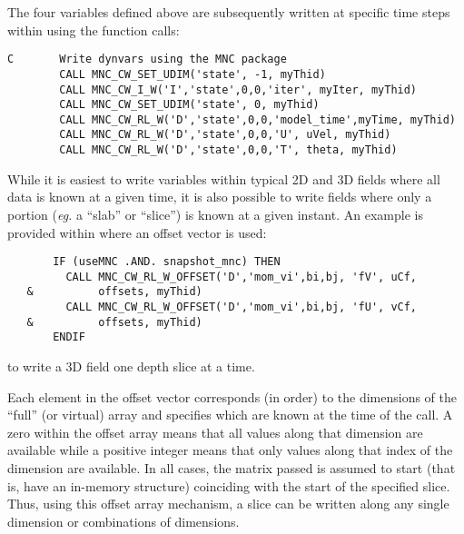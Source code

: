 The four variables defined above are subsequently written at specific
time steps within
using the function calls:
{\footnotesize
\begin{verbatim}
C       Write dynvars using the MNC package
        CALL MNC_CW_SET_UDIM('state', -1, myThid)
        CALL MNC_CW_I_W('I','state',0,0,'iter', myIter, myThid)
        CALL MNC_CW_SET_UDIM('state', 0, myThid)
        CALL MNC_CW_RL_W('D','state',0,0,'model_time',myTime, myThid)
        CALL MNC_CW_RL_W('D','state',0,0,'U', uVel, myThid)
        CALL MNC_CW_RL_W('D','state',0,0,'T', theta, myThid)
\end{verbatim}
}

While it is easiest to write variables within typical 2D and 3D fields
where all data is known at a given time, it is also possible to write
fields where only a portion (\textit{eg.} a ``slab'' or ``slice'') is
known at a given instant.  An example is provided within
where an offset vector is used: {\footnotesize
\begin{verbatim}
       IF (useMNC .AND. snapshot_mnc) THEN
         CALL MNC_CW_RL_W_OFFSET('D','mom_vi',bi,bj, 'fV', uCf,
   &          offsets, myThid)
         CALL MNC_CW_RL_W_OFFSET('D','mom_vi',bi,bj, 'fU', vCf,
   &          offsets, myThid)
       ENDIF
\end{verbatim}
}
to write a 3D field one depth slice at a time.

Each element in the offset vector corresponds (in order) to the
dimensions of the ``full'' (or virtual) array and specifies which are
known at the time of the call.  A zero within the offset array means
that all values along that dimension are available while a positive
integer means that only values along that index of the dimension are
available.  In all cases, the matrix passed is assumed to start (that
is, have an in-memory structure) coinciding with the start of the
specified slice.  Thus, using this offset array mechanism, a slice
can be written along any single dimension or combinations of
dimensions.


